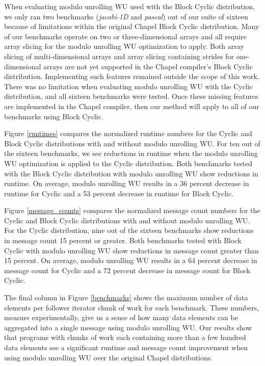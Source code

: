 When evaluating modulo unrolling WU used with the Block Cyclic distribution, we only ran two benchmarks (\textit{jacobi-1D} and \textit{pascal}) out of our suite of sixteen because of limitations within the original Chapel Block Cyclic distribution. Many of our benchmarks operate on two or three-dimensional arrays and all require array slicing for the modulo unrolling WU optimization to apply. Both array slicing of multi-dimensional arrays and array slicing containing strides for one-dimensional arrays are not yet supported in the Chapel compiler's Block Cyclic distribution. Implementing such features remained outside the scope of this work. There was no limitation when evaluating modulo unrolling WU with the Cyclic distribution, and all sixteen benchmarks were tested. Once these missing features are implemented in the Chapel compiler, then our method will apply to all of our benchmarks using Block Cyclic.

Figure \ref{runtimes} compares the normalized runtime numbers for the Cyclic and Block Cyclic distributions with and without modulo unrolling WU. For ten out of the sixteen benchmarks, we see reductions in runtime when the modulo unrolling WU optimization is applied to the Cyclic distribution. Both benchmarks tested with the Block Cyclic distribution with modulo unrolling WU show reductions in runtime. On average, modulo unrolling WU results in a 36 percent decrease in runtime for Cyclic and a 53 percent decrease in runtime for Block Cyclic. 

Figure \ref{message_counts} compares the normalized message count numbers for the Cyclic and Block Cyclic distributions with and without modulo unrolling WU. For the Cyclic distribution, nine out of the sixteen benchmarks show reductions in message count 15 percent or greater. Both benchmarks tested with Block Cyclic with modulo unrolling WU show reductions in message count greater than 15 percent. On average, modulo unrolling WU results in a 64 percent decrease in message count for Cyclic and a 72 percent decrease in message count for Block Cyclic. 

The final column in Figure \ref{benchmarks} shows the maximum number of data elements per follower iterator chunk of work for each benchmark. These numbers, measure experimentally, give us a sense of how many data elements can be aggregated into a single message using modulo unrolling WU. Our results show that programs with chunks of work each containing more than a few hundred data elements see a significant runtime and message count improvement when using modulo unrolling WU over the original Chapel distributions. 

